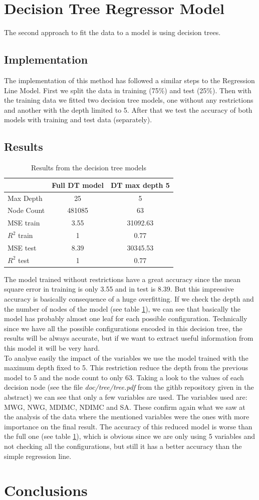 \documentclass[sigconf,authorversion]{acmart}
\begin{document}
\section{Decision Tree Regressor Model}
The second approach to fit the data to a model is using decision trees.
\subsection{Implementation}
The implementation of this method has followed a similar steps to the Regression Line Model. First we split the data in training (75\%) and test (25\%). Then with the training data we fitted two decision tree models, one without any restrictions and another with the depth limited to 5. After that we test the accuracy of both models with training and test data (separately).
\subsection{Results}
\begin{table}[htbp]
\begin{tabular}{lcc}
  \toprule
  & Full DT model & DT max depth 5 \\
  \midrule
  Max Depth & 25 & 5 \\
  Node Count & 481085 & 63 \\
  MSE train & 3.55 & 31092.63 \\
  $R^2$ train & 1 & 0.77 \\
  MSE test & 8.39 & 30345.53 \\
  $R^2$ test & 1 & 0.77 \\
  \bottomrule
\end{tabular}
\caption{Results from the decision tree models}
\label{tab:dt}
\end{table}
The model trained without restrictions have a great accuracy since the mean square error in training is only 3.55 and in test is 8.39. But this impressive accuracy is basically consequence of a huge overfitting. If we check the depth and the number of nodes of the model (see table \ref{tab:dt}), we can see that basically the model has probably almost one leaf for each possible configuration. Technically since we have all the possible configurations encoded in this decision tree, the results will be always accurate, but if we want to extract useful information from this model it will be very hard.\\
To analyse easily the impact of the variables we use the model trained with the maximum depth fixed to 5. This restriction reduce the depth from the previous model to 5 and the node count to only 63. Taking a look to the values of each decision node (see the file \textit{doc/tree/tree.pdf} from the githb repository given in the abstract) we can see that only a few variables are used. The variables used are: MWG, NWG, MDIMC, NDIMC and SA. These confirm again what we saw at the analysis of the data where the mentioned variables were the ones with more importance on the final result. The accuracy of this reduced model is worse than the full one (see table \ref{tab:dt}), which is obvious since we are only using 5 variables and not checking all the configurations, but still it has a better accuracy than the simple regression line.
\section{Conclusions}



\end{document}
